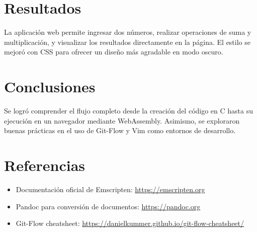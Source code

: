 \documentclass[12pt,a4paper]{article}
\begin{document}
	\section{Resultados}
	La aplicación web permite ingresar dos números, realizar operaciones de suma y multiplicación, y visualizar los resultados directamente en la página. El estilo se mejoró con CSS para ofrecer un diseño más agradable en modo oscuro.
	
	\section{Conclusiones}
	Se logró comprender el flujo completo desde la creación del código en C hasta su ejecución en un navegador mediante WebAssembly. Asimismo, se exploraron buenas prácticas en el uso de Git-Flow y Vim como entornos de desarrollo.
	
	\section{Referencias}
	\begin{itemize}
		\item Documentación oficial de Emscripten: \url{https://emscripten.org}
		\item Pandoc para conversión de documentos: \url{https://pandoc.org}
		\item Git-Flow cheatsheet: \url{https://danielkummer.github.io/git-flow-cheatsheet/}
	\end{itemize}
	
\end{document}
